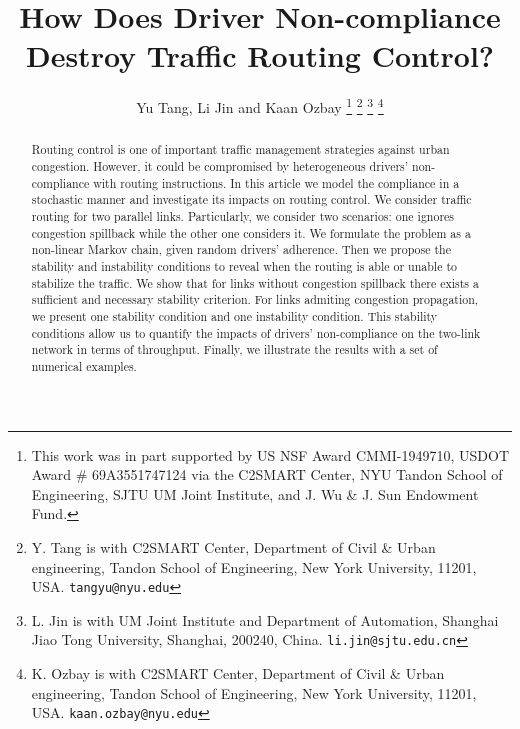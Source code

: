 \documentclass[letterpaper, 10 pt, conference]{ieeeconf}  %
\title{\LARGE \bf
How Does Driver Non-compliance Destroy Traffic Routing Control?
}
\author{Yu Tang, Li Jin and Kaan Ozbay
\thanks{This work was in part supported by US NSF Award CMMI-1949710, USDOT Award \# 69A3551747124 via the C2SMART Center, NYU Tandon School of Engineering, SJTU UM Joint Institute, and J. Wu \& J. Sun Endowment Fund.}%
\thanks{Y. Tang is with C2SMART Center, Department of Civil \& Urban engineering, Tandon School of Engineering, New York University, 11201, USA.
        {\tt\small tangyu@nyu.edu}}%
\thanks{L. Jin is with UM Joint Institute and Department of Automation, Shanghai Jiao Tong University, Shanghai, 200240, China.
        {\tt\small li.jin@sjtu.edu.cn}}%
\thanks{K. Ozbay is with C2SMART Center, Department of Civil \& Urban engineering, Tandon School of Engineering, New York University, 11201, USA.
        {\tt\small kaan.ozbay@nyu.edu}}
}
\begin{document}
\maketitle
\thispagestyle{empty}
\pagestyle{empty}


\begin{abstract}
Routing control is one of important traffic management strategies against urban congestion. However, it could be compromised by heterogeneous drivers’ non-compliance with routing instructions. In this article we model the compliance in a stochastic manner and investigate its impacts on routing control. We consider traffic routing for two parallel links. Particularly, we consider two scenarios: one ignores congestion spillback while the other one considers it. We formulate the problem as a non-linear Markov chain, given random drivers’ adherence. Then we propose the stability and instability conditions to reveal when the routing is able or unable to stabilize the traffic. We show that for links without congestion spillback there exists a sufficient and necessary stability criterion. For links admiting congestion propagation, we present one stability condition and one instability condition. This stability conditions allow us to quantify the impacts of drivers' non-compliance on the two-link network in terms of throughput. Finally, we illustrate the results with a set of numerical examples.
\end{abstract}














\end{document}
